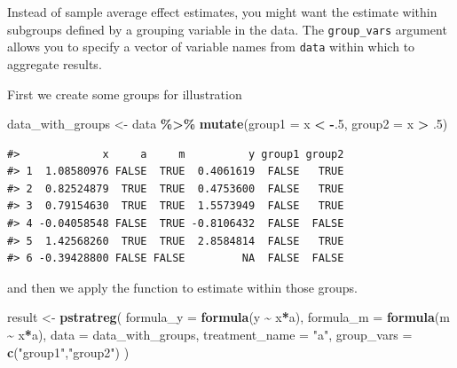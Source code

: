 \documentclass[
]{book}
\newenvironment{Shaded}{\begin{snugshade}}{\end{snugshade}}
\newcommand{\AttributeTok}[1]{\textcolor[rgb]{0.13,0.29,0.53}{#1}}
\newcommand{\DecValTok}[1]{\textcolor[rgb]{0.00,0.00,0.81}{#1}}
\newcommand{\FunctionTok}[1]{\textcolor[rgb]{0.13,0.29,0.53}{\textbf{#1}}}
\newcommand{\NormalTok}[1]{#1}
\newcommand{\OtherTok}[1]{\textcolor[rgb]{0.56,0.35,0.01}{#1}}
\newcommand{\SpecialCharTok}[1]{\textcolor[rgb]{0.81,0.36,0.00}{\textbf{#1}}}
\newcommand{\StringTok}[1]{\textcolor[rgb]{0.31,0.60,0.02}{#1}}
\begin{document}
Instead of sample average effect estimates, you might want the estimate within subgroups defined by a grouping variable in the data. The \texttt{group\_vars} argument allows you to specify a vector of variable names from \texttt{data} within which to aggregate results.

First we create some groups for illustration

\begin{Shaded}
\begin{Highlighting}[]
\NormalTok{data\_with\_groups }\OtherTok{\textless{}{-}}\NormalTok{ data }\SpecialCharTok{\%\textgreater{}\%}
  \FunctionTok{mutate}\NormalTok{(}\AttributeTok{group1 =}\NormalTok{ x }\SpecialCharTok{\textless{}} \SpecialCharTok{{-}}\NormalTok{.}\DecValTok{5}\NormalTok{,}
         \AttributeTok{group2 =}\NormalTok{ x }\SpecialCharTok{\textgreater{}}\NormalTok{ .}\DecValTok{5}\NormalTok{)}
\end{Highlighting}
\end{Shaded}

\begin{verbatim}
#>             x     a     m          y group1 group2
#> 1  1.08580976 FALSE  TRUE  0.4061619  FALSE   TRUE
#> 2  0.82524879  TRUE  TRUE  0.4753600  FALSE   TRUE
#> 3  0.79154630  TRUE  TRUE  1.5573949  FALSE   TRUE
#> 4 -0.04058548 FALSE  TRUE -0.8106432  FALSE  FALSE
#> 5  1.42568260  TRUE  TRUE  2.8584814  FALSE   TRUE
#> 6 -0.39428800 FALSE FALSE         NA  FALSE  FALSE
\end{verbatim}

and then we apply the function to estimate within those groups.

\begin{Shaded}
\begin{Highlighting}[]
\NormalTok{result }\OtherTok{\textless{}{-}} \FunctionTok{pstratreg}\NormalTok{(}
  \AttributeTok{formula\_y =} \FunctionTok{formula}\NormalTok{(y }\SpecialCharTok{\textasciitilde{}}\NormalTok{ x}\SpecialCharTok{*}\NormalTok{a),}
  \AttributeTok{formula\_m =} \FunctionTok{formula}\NormalTok{(m }\SpecialCharTok{\textasciitilde{}}\NormalTok{ x}\SpecialCharTok{*}\NormalTok{a),}
  \AttributeTok{data =}\NormalTok{ data\_with\_groups,}
  \AttributeTok{treatment\_name =} \StringTok{"a"}\NormalTok{,}
  \AttributeTok{group\_vars =} \FunctionTok{c}\NormalTok{(}\StringTok{"group1"}\NormalTok{,}\StringTok{"group2"}\NormalTok{)}
\NormalTok{)}
\end{Highlighting}
\end{Shaded}
\end{document}
